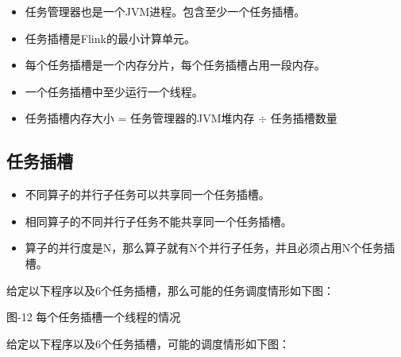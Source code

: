 \begin{itemize}
\tightlist
\item
  任务管理器也是一个JVM进程。包含至少一个任务插槽。
\item
  任务插槽是Flink的最小计算单元。
\item
  每个任务插槽是一个内存分片，每个任务插槽占用一段内存。
\item
  一个任务插槽中至少运行一个线程。
\item
  任务插槽内存大小 = 任务管理器的JVM堆内存 \(\div\) 任务插槽数量
\end{itemize}

\hypertarget{ux4efbux52a1ux63d2ux69fd}{%
\subsection{任务插槽}\label{ux4efbux52a1ux63d2ux69fd}}

\begin{itemize}
\tightlist
\item
  不同算子的并行子任务可以共享同一个任务插槽。
\item
  相同算子的不同并行子任务不能共享同一个任务插槽。
\item
  算子的并行度是N，那么算子就有N个并行子任务，并且必须占用N个任务插槽。
\end{itemize}

给定以下程序以及6个任务插槽，那么可能的任务调度情形如下图：

\begin{Shaded}
\begin{Highlighting}[]
\OperatorTok{(}\OperatorTok{)}
  \OperatorTok{(}\OperatorTok{)}
  \OperatorTok{(}\OperatorTok{)}
  \OperatorTok{(}\OperatorTok{)}
\end{Highlighting}
\end{Shaded}

图-12 每个任务插槽一个线程的情况

给定以下程序以及6个任务插槽，可能的调度情形如下图：

\begin{Shaded}
\begin{Highlighting}[]
\OperatorTok{(}\OperatorTok{)}
  \OperatorTok{(}\OperatorTok{)}
  \OperatorTok{(}\OperatorTok{)}
  \OperatorTok{(}\OperatorTok{)}
\end{Highlighting}
\end{Shaded}

